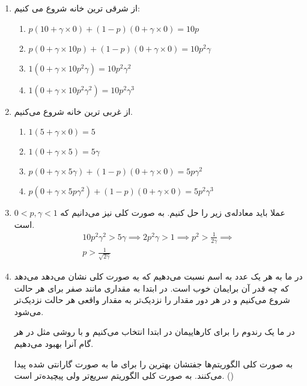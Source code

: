 \begin{enumerate}
    \item از شرقی ترین خانه شروع می کنیم:
    \begin{enumerate}
        \item $p (10 + \gamma \times 0) + (1 - p) (0 + \gamma \times 0) = 10p$
        \item $p (0 + \gamma \times 10p) + (1 - p) (0 + \gamma \times 0) = 10p^2 \gamma$
        \item $1 (0 + \gamma \times 10p^2 \gamma) = 10p^2 \gamma^2$
        \item $1 (0 + \gamma \times 10p^2 \gamma^2) = 10p^2 \gamma^3$
    \end{enumerate}
    \item از غربی ترین خانه شروع می‌کنیم.
    \begin{enumerate}
        \item $1 (5 + \gamma \times 0) = 5$
        \item $1 (0 + \gamma \times 5) = 5\gamma$
        \item $p (0 + \gamma \times 5\gamma) + (1 - p) (0 + \gamma \times 0) = 5 p \gamma^2$
        \item $p (0 + \gamma \times 5p\gamma^2) + (1 - p) (0 + \gamma \times 0) = 5 p^2 \gamma^3$
    \end{enumerate}
    \item عملا باید معادله‌ی زیر را حل کنیم. به صورت کلی نیز می‌دانیم که
    $0 < p, \gamma < 1$
    است.
    \begin{gather*}
        10p^2 \gamma^2 > 5\gamma \implies 2p^2 \gamma > 1 \implies p^2 > \frac{1}{2\gamma} \implies\\
        p > \frac{1}{\sqrt{2\gamma}}
    \end{gather*}
    \item در 
    ما به هر
    یک عدد به اسم
    نسبت می‌دهیم که به صورت کلی نشان می‌دهد می‌دهد که چه قدر آن
    برایمان خوب است. در ابتدا به مقداری مانند صفر برای هر حالت شروع می‌کنیم و در هر دور مقدار
    را نزدیک‌تر به مقدار واقعی هر حالت نزدیک‌تر می‌شود.

    در
    ما یک
    رندوم را برای کار‌هاییمان در ابتدا انتخاب می‌کنیم و با روشی مثل
    در هر گام آنرا بهبود می‌دهیم.
    
    به صورت کلی الگوریتم‌ها جفتشان بهترین
    را برای ما به صورت گارانتی شده پیدا می‌کنند. به صورت کلی الگوریتم
    سریع‌تر ولی پیچیده‌تر است.
    ()
\end{enumerate}


